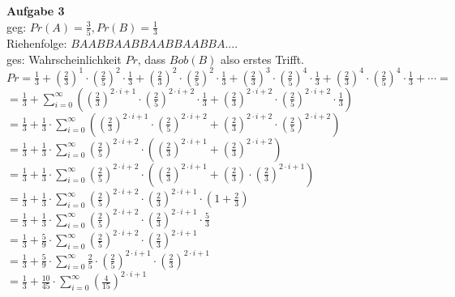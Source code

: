 \documentclass[a4paper]{scrartcl}
\begin{document}
	\begin{flushleft}
		\textbf{Aufgabe 3}\\
		geg: $Pr(A)=\frac{3}{5}, Pr(B)=\frac{1}{3}$\\
		Riehenfolge: $BAABBAABBAABBAABBA....$\\
		ges: Wahrscheinlichkeit $Pr$, dass $Bob(B)$ also erstes Trifft.\\[1em]
		$Pr=\frac{1}{3}+(\frac{2}{3})^1\cdot(\frac{2}{5})^2\cdot\frac{1}{3}+(\frac{2}{3})^2\cdot(\frac{2}{5})^2\cdot\frac{1}{3}+(\frac{2}{3})^3\cdot(\frac{2}{5})^4\cdot\frac{1}{3}+(\frac{2}{3})^4\cdot(\frac{2}{5})^4\cdot\frac{1}{3}+\cdots=$\\
		$=\frac{1}{3}+\sum\limits_{i=0}^{\infty}((\frac{2}{3})^{2\cdot i+1}\cdot(\frac{2}{5})^{2\cdot i+2}\cdot\frac{1}{3} + (\frac{2}{3})^{2\cdot i+2}\cdot(\frac{2}{5})^{2\cdot i+2}\cdot\frac{1}{3})$\\
		$=\frac{1}{3}+\frac{1}{3}\cdot\sum\limits_{i=0}^{\infty}((\frac{2}{3})^{2\cdot i+1}\cdot(\frac{2}{5})^{2\cdot i+2} + (\frac{2}{3})^{2\cdot i+2}\cdot(\frac{2}{5})^{2\cdot i+2})$\\
		$=\frac{1}{3}+\frac{1}{3}\cdot\sum\limits_{i=0}^{\infty}(\frac{2}{5})^{2\cdot i+2}\cdot((\frac{2}{3})^{2\cdot i+1} + (\frac{2}{3})^{2\cdot i+2})$\\
		$=\frac{1}{3}+\frac{1}{3}\cdot\sum\limits_{i=0}^{\infty}(\frac{2}{5})^{2\cdot i+2}\cdot((\frac{2}{3})^{2\cdot i+1} + (\frac{2}{3})\cdot(\frac{2}{3})^{2\cdot i+1})$\\
		$=\frac{1}{3}+\frac{1}{3}\cdot\sum\limits_{i=0}^{\infty}(\frac{2}{5})^{2\cdot i+2}\cdot(\frac{2}{3})^{2\cdot i+1}\cdot(1 + \frac{2}{3})$\\
		$=\frac{1}{3}+\frac{1}{3}\cdot\sum\limits_{i=0}^{\infty}(\frac{2}{5})^{2\cdot i+2}\cdot(\frac{2}{3})^{2\cdot i+1}\cdot\frac{5}{3}$\\
		$=\frac{1}{3}+\frac{5}{9}\cdot\sum\limits_{i=0}^{\infty}(\frac{2}{5})^{2\cdot i+2}\cdot(\frac{2}{3})^{2\cdot i+1}$\\
		$=\frac{1}{3}+\frac{5}{9}\cdot\sum\limits_{i=0}^{\infty}\frac{2}{5}\cdot(\frac{2}{5})^{2\cdot i+1}\cdot(\frac{2}{3})^{2\cdot i+1}$\\
		$=\frac{1}{3}+\frac{10}{45}\cdot\sum\limits_{i=0}^{\infty}(\frac{4}{15})^{2\cdot i+1}$\\
 	\end{flushleft}
\end{document}
